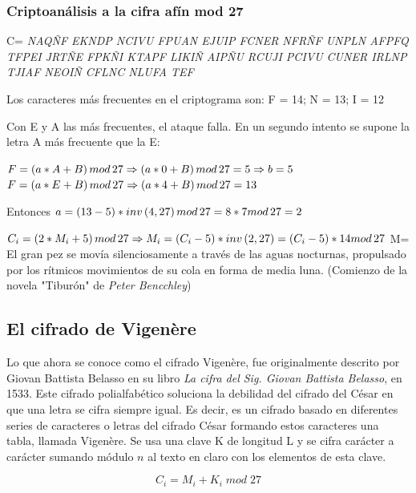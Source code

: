\documentclass{article}
\begin{document}
\subsubsection{Criptoanálisis a la cifra afín mod 27}

C= \emph{ NAQÑF EKNDP NCIVU FPUAN EJUIP FCNER NFRÑF UNPLN\newline
    AFPFQ TFPEI JRTÑE FPKÑI KTAPF LIKIÑ AIPÑU RCUJI\newline
    PCIVU CUNER IRLNP TJIAF NEOIÑ CFLNC NLUFA TEF}

Los caracteres más frecuentes en el criptograma son: F = 14; N = 13; I = 12

Con E y A las más frecuentes, el ataque falla. En un segundo intento se supone la letra A más frecuente que la E:

$ F = \left(a*A+B\right) mod \thinspace 27 \Rightarrow  \left(a*0+B\right) mod \thinspace 27 = 5 \Rightarrow b=5$
$F = \left(a*E+B\right) mod \thinspace 27 \Rightarrow  \left(a*4+B\right) mod \thinspace 27 = 13$

Entonces $a= \left(13-5\right) * inv \left(4, 27\right) mod \thinspace 27 = 8 * 7 mod \thinspace 27 =2$

$C_{i}= \left(2*M_{i}+5\right) mod \thinspace 27 \Rightarrow M_{i}= \left(C_{i}-5\right)*inv\left(2,27\right) = \left(C_{i}-5\right)*14 mod \thinspace 27 $
\justify
M= El gran pez se movía silenciosamente a través de las aguas nocturnas, propulsado por los rítmicos movimientos de su cola en forma de media luna. 
(Comienzo de la novela "Tiburón" de \textit{Peter Bencchley})

\subsection{El cifrado de Vigenère}
\justify
Lo que ahora se conoce como el cifrado Vigenère, fue originalmente descrito por Giovan Battista Belasso en su libro \emph{La cifra del Sig. Giovan Battista Belasso}, en 1533. Este cifrado polialfabético soluciona la debilidad del cifrado del César en que una letra se cifra siempre igual. Es decir, es un cifrado basado en diferentes series de caracteres o letras del cifrado César formando estos caracteres una tabla, llamada Vigenère. Se usa una clave K de longitud L y se cifra carácter a carácter sumando módulo $n$ al texto en claro con los elementos de esta clave. 

\begin{equation*}
        C_{i}= M_{i} + K_{i}\; mod \; 27
\end{equation*}
\end{document}
